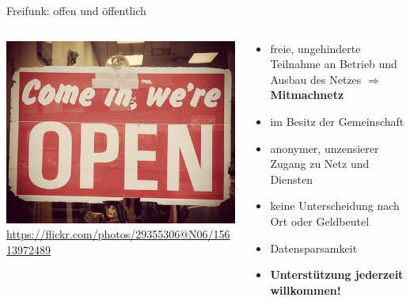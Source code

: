 \documentclass[10pt]{beamer}
\begin{document}
    \begin{frame}{Freifunk: offen und öffentlich}
      \begin{columns}[c]
        \begin{column}{5cm}
          \includegraphics[width=\textwidth]{images/open}
          \newline \tiny \url{https://flickr.com/photos/29355306@N06/15613972489}
        \end{column}
        \begin{column}{7cm}
          \begin{itemize}[<+->]
            \item freie, ungehinderte Teilnahme an Betrieb und Ausbau des Netzes $\Rightarrow$ \textbf{Mitmachnetz}
            \item im Besitz der Gemeinschaft
            \item anonymer, unzensierer Zugang zu Netz und Diensten
            \item keine Unterscheidung nach Ort oder Geldbeutel
            \item Datensparsamkeit
            \item \textbf{Unterstützung jederzeit willkommen!}
          \end{itemize}
        \end{column}
      \end{columns}
    \end{frame}
\end{document}
